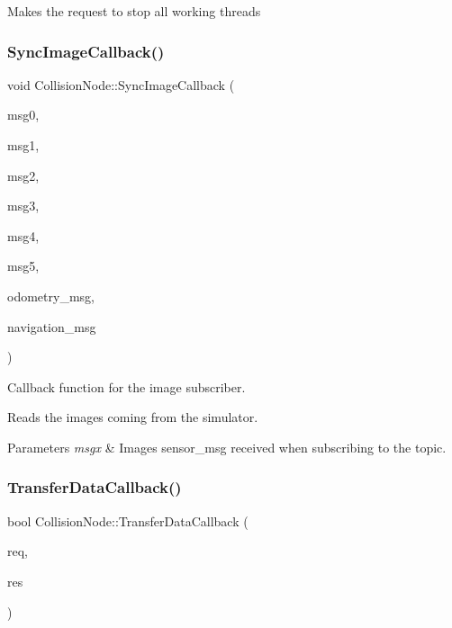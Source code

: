 Makes the request to stop all working threads \mbox{\label{classCollisionNode_a9e89d147a0f24c385ba33aeab2592ea8}} 
\subsubsection{\texorpdfstring{Sync\+Image\+Callback()}{SyncImageCallback()}}
{\footnotesize\ttfamily void Collision\+Node\+::\+Sync\+Image\+Callback (\begin{DoxyParamCaption}\item[{const sensor\+\_\+msgs\+::\+Image\+Const\+Ptr \&}]{msg0,  }\item[{const sensor\+\_\+msgs\+::\+Image\+Const\+Ptr \&}]{msg1,  }\item[{const sensor\+\_\+msgs\+::\+Image\+Const\+Ptr \&}]{msg2,  }\item[{const sensor\+\_\+msgs\+::\+Image\+Const\+Ptr \&}]{msg3,  }\item[{const sensor\+\_\+msgs\+::\+Image\+Const\+Ptr \&}]{msg4,  }\item[{const sensor\+\_\+msgs\+::\+Image\+Const\+Ptr \&}]{msg5,  }\item[{const nav\+\_\+msgs\+::\+Odometry\+Const\+Ptr \&}]{odometry\+\_\+msg,  }\item[{const cola2\+\_\+msgs\+::\+Nav\+Sts\+Const\+Ptr \&}]{navigation\+\_\+msg }\end{DoxyParamCaption})\hspace{0.3cm}{\ttfamily [inline]}}



Callback function for the image subscriber. 

Reads the images coming from the simulator. 
\begin{DoxyParams}{Parameters}
{\em msgx} & Images sensor\+\_\+msg received when subscribing to the topic. \\
\hline
\end{DoxyParams}
\mbox{\label{classCollisionNode_ad6e10b8e744b58de9ceea86c2a5a5661}} 
\subsubsection{\texorpdfstring{Transfer\+Data\+Callback()}{TransferDataCallback()}}
{\footnotesize\ttfamily bool Collision\+Node\+::\+Transfer\+Data\+Callback (\begin{DoxyParamCaption}\item[{collision\+\_\+detection\+\_\+module\+::\+Transfer\+Data\+::\+Request \&}]{req,  }\item[{collision\+\_\+detection\+\_\+module\+::\+Transfer\+Data\+::\+Response \&}]{res }\end{DoxyParamCaption})\hspace{0.3cm}{\ttfamily [inline]}}

